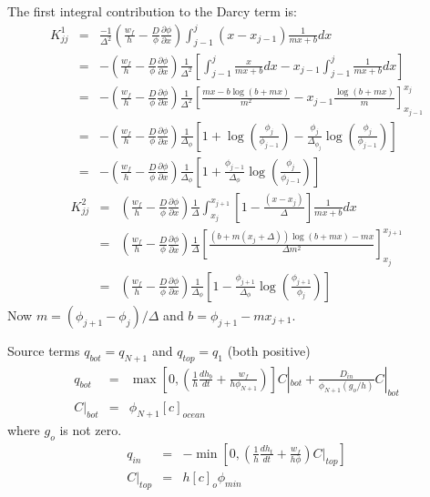 The first integral contribution to the Darcy term is:
\begin{eqnarray}
K^1_{jj} & = &
\frac{-1}{\Delta ^2}\left(\frac{w_f}{h}-\frac{D}{\phi}\frac{\partial
    \phi}{\partial x}\right)\int_{j-1}^{j}(x-x_{j-1})\frac{1}{mx
  + b}dx \nonumber \\
& = &-\left(\frac{w_f}{h}-\frac{D}{\phi}\frac{\partial
    \phi}{\partial x}\right) \frac{1}{\Delta^2}\left[ \int_{j-1}^{j}\frac{x}{mx + b}dx - x_{j-1}\int_{j-1}^{j}\frac{1}{mx
  + b}dx  \right] \nonumber \\
& = &- \left(\frac{w_f}{h}-\frac{D}{\phi}\frac{\partial
    \phi}{\partial x}\right) \frac{1}{\Delta^2}\left[ \frac{mx - b\log(b + mx)}{m^2} -
  x_{j-1}\frac{\log(b+mx)}{m}\right]^{x_j}_{x_{j-1}} \nonumber \\
& = & -\left(\frac{w_f}{h}-\frac{D}{\phi}\frac{\partial
    \phi}{\partial x}\right)\frac{1}{\Delta_{\phi}}\left[ 1 + \log \left( \frac{\phi_j}{\phi_{j-1}} \right) -
  \frac{\phi_j}{\Delta_{\phi_j}}\log \left(
    \frac{\phi_j}{\phi_{j-1}} \right)\right] \nonumber \\
& = & -\left(\frac{w_f}{h}-\frac{D}{\phi}\frac{\partial
    \phi}{\partial x}\right)\frac{1}{\Delta_{\phi}}\left[ 1 +  \frac{\phi_{j-1}}{\Delta_{\phi}}\log \left( \frac{\phi_j}{\phi_{j-1}} \right) \right]
\end{eqnarray}
\begin{eqnarray}
K^2_{jj} & = & \left(\frac{w_f}{h}-\frac{D}{\phi}\frac{\partial
    \phi}{\partial x}\right)\frac{1}{\Delta}\int_{x_{j}}^{x_{j+1}}\left[1 -
  \frac{(x-x_{j})}{\Delta}\right]\frac{1}{mx+b} dx \nonumber \\
& = & \left(\frac{w_f}{h}-\frac{D}{\phi}\frac{\partial
    \phi}{\partial x}\right)\frac{1}{\Delta}\left[\frac{
    (b+m(x_j+\Delta))\log(b+mx)-mx}{\Delta
    m^2}\right]_{x_{j}}^{x_{j+1}} \nonumber \\
& = & \left(\frac{w_f}{h}-\frac{D}{\phi}\frac{\partial
    \phi}{\partial x}\right)\frac{1}{\Delta_{\phi}}\left[ 1 -  \frac{\phi_{j+1}}{\Delta_{\phi}}\log \left( \frac{\phi_{j+1}}{\phi_{j}} \right) \right]
\end{eqnarray}
Now $m = (\phi_{j+1}-\phi_{j})/\Delta$ and $b = \phi_{j+1} -
mx_{j+1}$.

Source terms $q_{bot} = q_{N+1}$ and $q_{top} = q_{1}$ (both positive)
\begin{eqnarray}
q_{bot} & = &\max\left[0, \left(\frac{1}{h}\frac{dh_b}{dt} +
\frac{w_f}{h \phi_{N+1}}\right)\right]C|_{bot} +
\frac{D_{in}}{\phi_{N+1}(g_o/h)}C|_{bot} \nonumber \\
  C|_{bot}&= & \phi_{N+1}[c]_{ocean}
\end{eqnarray}
where $g_o$ is not zero.
\begin{eqnarray}
q_{in}&  = & -\min\left[ 0, \left(\frac{1}{h}\frac{dh_t}{dt} +
\frac{w_f}{h\phi}\right)C|_{top} \right]  \nonumber \\
C|_{top}& = & h [c]_o\phi_{min}
\end{eqnarray}

